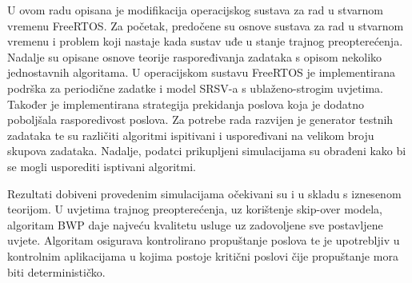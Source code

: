 \documentclass[../zavrsni.tex]{subfiles}
\begin{document}
\sloppy

\justifying

U ovom radu opisana je modifikacija operacijskog sustava za rad u stvarnom vremenu FreeRTOS. Za početak, predočene su osnove sustava za 
rad u stvarnom vremenu i problem koji nastaje kada sustav uđe u stanje trajnog preopterećenja. Nadalje su opisane osnove teorije raspoređivanja 
zadataka s opisom nekoliko jednostavnih algoritama. 
U operacijskom sustavu FreeRTOS je implementirana podrška za periodične zadatke i model SRSV-a s ublaženo-strogim uvjetima.
Također je implementirana strategija prekidanja poslova koja je dodatno poboljšala rasporedivost poslova.
Za potrebe rada razvijen je generator testnih zadataka te su različiti algoritmi ispitivani i uspoređivani na velikom broju skupova zadataka.
Nadalje, podatci prikupljeni simulacijama su obrađeni kako bi se mogli usporediti isptivani algoritmi.

Rezultati dobiveni provedenim simulacijama očekivani su i u skladu s iznesenom teorijom. U uvjetima trajnog preopterećenja, uz korištenje skip-over modela,  
algoritam BWP daje najveću kvalitetu usluge uz zadovoljene sve postavljene uvjete. Algoritam osigurava kontrolirano propuštanje poslova te je upotrebljiv 
u kontrolnim aplikacijama u kojima postoje kritični poslovi čije propuštanje mora biti determinističko.
\end{document}
